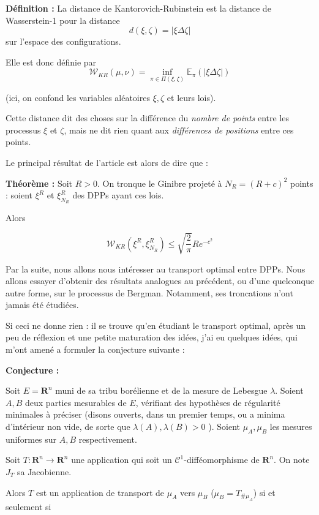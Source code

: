 \documentclass[12pt]{article}
\begin{document}
\textbf{Définition :} La distance de Kantorovich-Rubinstein est la distance de Wasserstein-1 pour la distance $$ d(\xi, \zeta) = |\xi \Delta \zeta| $$ sur l'espace des configurations.

Elle est donc définie par $$ \mathcal W_{KR}(\mu, \nu) = \inf_{\pi \in \Pi(\xi, \zeta)} \mathbb E_\pi(|\xi \Delta \zeta|) $$ 

(ici, on confond les variables aléatoires $ \xi, \zeta $ et leurs lois).

Cette distance dit des choses sur la différence du \textit{nombre de points} entre les processus $ \xi $ et $ \zeta $, mais ne dit rien quant aux \textit{différences de positions} entre ces points.

Le principal résultat de l'article est alors de dire que :

\textbf{Théorème :} Soit $R > 0$. On tronque le Ginibre projeté à $ N_R = (R+c)^2 $ points : soient $ \xi^R $ et $ \xi^R_{N_R} $ des DPPs ayant ces lois.

Alors

$$ \mathcal W_{KR}(\xi^R, \xi^R_{N_R}) \leqslant \sqrt{\frac{2}{\pi}} R e^{-c^2} $$

\bigskip

Par la suite, nous allons nous intéresser au transport optimal entre DPPs. Nous allons essayer d'obtenir des résultats analogues au précédent, ou d'une quelconque autre forme, sur le processus de Bergman. Notamment, ses troncations n'ont jamais été étudiées.

Si ceci ne donne rien : il se trouve qu'en étudiant le transport optimal, après un peu de réflexion et une petite maturation des idées, j'ai eu quelques idées, qui m'ont amené a formuler la conjecture suivante :

\textbf{Conjecture :}

Soit $E = \mathbf R^n $ muni de sa tribu borélienne et de la mesure de Lebesgue $ \lambda $. Soient $A,B$ deux parties mesurables de $E$, vérifiant des hypothèses de régularité minimales à préciser (disons ouverts, dans un premier temps, ou a minima d'intérieur non vide, de sorte que $ \lambda(A),\lambda(B) > 0 $ ). Soient $ \mu_A, \mu_B$ les mesures uniformes sur $A,B$ respectivement.

Soit $ T : \mathbf R^n \to \mathbf R^n $ une application qui soit un $\mathcal C^1$-difféomorphisme de $\mathbf R^n$. On note $ J_T $ sa Jacobienne.

Alors $T$ est un application de transport de $ \mu_A $ vers $ \mu_B $ ($ \mu_B = T_{\# \mu_A} $) si et seulement si 
\end{document}
